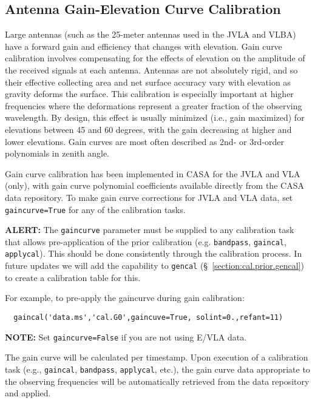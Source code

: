 \subsection{Antenna Gain-Elevation Curve Calibration}
\label{section:cal.prior.curves}

Large antennas (such as the 25-meter antennas used
in the JVLA and VLBA) have a forward gain and efficiency that changes with
elevation. Gain curve calibration involves compensating for the effects of
elevation on the amplitude of the received signals at each antenna.
Antennas are not absolutely rigid, and so their effective collecting
area and net surface accuracy vary with elevation as gravity deforms
the surface.  This calibration is especially important at higher
frequencies where the deformations represent a greater fraction of the
observing wavelength.  By design, this effect is usually minimized
(i.e., gain maximized) for elevations between 45 and 60 degrees, with
the gain decreasing at higher and lower elevations.  Gain curves are
most often described as 2nd- or 3rd-order polynomials in zenith angle.

Gain curve calibration has been implemented in CASA for the JVLA and
VLA (only), with gain curve polynomial coefficients available directly
from the CASA data repository.  To make gain curve corrections for
JVLA and VLA data, set {\tt gaincurve=True} for any of the calibration
tasks.

{\bf ALERT:} The {\tt gaincurve} parameter must be supplied
to any calibration task that allows pre-application of the prior
calibration (e.g. {\tt bandpass}, {\tt gaincal}, {\tt applycal}).
This should be done consistently through the calibration process.
In future updates we will add the capability to {\tt gencal}
(\S~\ref{section:cal.prior.gencal}) to create a calibration table for this.

For example, to pre-apply the gaincurve during gain calibration:
\small
\begin{verbatim}
  gaincal('data.ms','cal.G0',gaincuve=True, solint=0.,refant=11)
\end{verbatim}
\normalsize
{\bf NOTE:} Set {\tt gaincurve=False} if you are not using E/VLA data.

The gain curve will be calculated per timestamp.  Upon execution of a
calibration task (e.g., {\tt gaincal}, {\tt bandpass}, {\tt applycal}, 
etc.), the gain
curve data appropriate to the observing frequencies will be
automatically retrieved from the data repository and applied.

